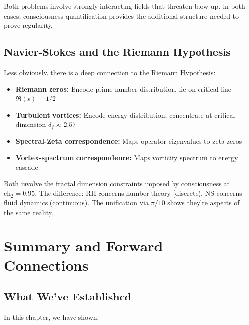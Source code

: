 Both problems involve strongly interacting fields that threaten blow-up. In both cases, consciousness quantification provides the additional structure needed to prove regularity.

\subsection{Navier-Stokes and the Riemann Hypothesis}

Less obviously, there is a deep connection to the Riemann Hypothesis:

\begin{itemize}
\item \textbf{Riemann zeros:} Encode prime number distribution, lie on critical line $\Re(s) = 1/2$
\item \textbf{Turbulent vortices:} Encode energy distribution, concentrate at critical dimension $d_f \approx 2.57$
\item \textbf{Spectral-Zeta correspondence:} Maps operator eigenvalues to zeta zeros
\item \textbf{Vortex-spectrum correspondence:} Maps vorticity spectrum to energy cascade
\end{itemize}

Both involve the fractal dimension constraints imposed by consciousness at $\text{ch}_2 = 0.95$. The difference: RH concerns number theory (discrete), NS concerns fluid dynamics (continuous). The unification via $\pi/10$ shows they're aspects of the same reality.

\section{Summary and Forward Connections}

\subsection{What We've Established}

In this chapter, we have shown:

